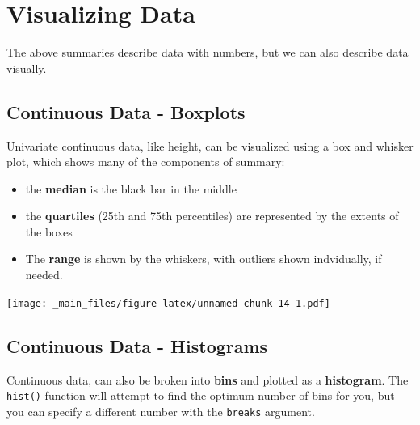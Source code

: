 \documentclass[
]{book}
\newenvironment{Shaded}{\begin{snugshade}}{\end{snugshade}}
\newcommand{\AttributeTok}[1]{\textcolor[rgb]{0.77,0.63,0.00}{#1}}
\newcommand{\FunctionTok}[1]{\textcolor[rgb]{0.00,0.00,0.00}{#1}}
\newcommand{\NormalTok}[1]{#1}
\newcommand{\SpecialCharTok}[1]{\textcolor[rgb]{0.00,0.00,0.00}{#1}}
\newcommand{\StringTok}[1]{\textcolor[rgb]{0.31,0.60,0.02}{#1}}
\providecommand{\tightlist}{%
  \setlength{\itemsep}{0pt}\setlength{\parskip}{0pt}}
\begin{document}
\hypertarget{visualizing-data}{%
\section{Visualizing Data}\label{visualizing-data}}

The above summaries describe data with numbers, but we can also describe data visually.

\hypertarget{continuous-data---boxplots}{%
\subsection{Continuous Data - Boxplots}\label{continuous-data---boxplots}}

Univariate continuous data, like height, can be visualized using a box and whisker plot, which shows many of the components of summary:

\begin{itemize}
\tightlist
\item
  the \textbf{median} is the black bar in the middle
\item
  the \textbf{quartiles} (25th and 75th percentiles) are represented by the extents of the boxes
\item
  The \textbf{range} is shown by the whiskers, with outliers shown indvidually, if needed.
\end{itemize}

\begin{Shaded}
\end{Shaded}

\texttt{[image: \_main\_files/figure-latex/unnamed-chunk-14-1.pdf]}

\hypertarget{continuous-data---histograms}{%
\subsection{Continuous Data - Histograms}\label{continuous-data---histograms}}

Continuous data, can also be broken into \textbf{bins} and plotted as a \textbf{histogram}. The \texttt{hist()} function will attempt to find the optimum number of bins for you, but you can specify a different number with the \texttt{breaks} argument.

\begin{Shaded}
\end{Shaded}
\end{document}
